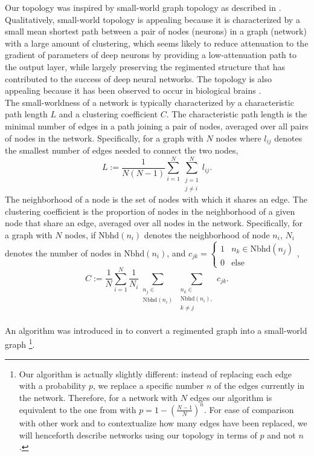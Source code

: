\documentclass{article}
\newcommand{\npar}{\\\indent}
\begin{document}
Our topology was inspired by small-world graph topology as described in \cite{watts98}. Qualitatively, small-world topology is appealing because it is characterized by a small mean shortest path between a pair of nodes (neurons) in a graph (network) with a large amount of clustering, which seems likely to reduce attenuation to the gradient of parameters of deep neurons by providing a low-attenuation path to the output layer, while largely preserving the regimented structure that has contributed to the success of deep neural networks. The topology is also appealing because it has been observed to occur in biological brains \cite{bullmore2009}.
\npar
The small-worldness of a network is typically characterized by a characteristic path length $L$ and a clustering coefficient $C$. The characteristic path length is the minimal number of edges in a path joining a pair of nodes, averaged over all pairs of nodes in the network. Specifically, for a graph with $N$ nodes where $l_{ij}$ denotes the smallest number of edges needed to connect the two nodes, 
\begin{equation}
\label{eqn:charpathlength}
L:=\frac{1}{N(N-1)}\sum_{i=1}^{N}\sum_{\substack{j=1\\j\neq i}}^{N}l_{ij}.
\end{equation}
The neighborhood of a node is the set of nodes with which it shares an edge. The clustering coefficient is the proportion of nodes in the neighborhood of a given node that share an edge, averaged over all nodes in the network. Specifically, for a graph with $N$ nodes, if $\text{Nbhd}(n_i)$ denotes the neighborhood of node $n_i$, $N_i$ denotes the number of nodes in $\text{Nbhd}(n_i)$, and $c_{jk}=\begin{cases}1 & n_k\in\text{Nbhd}(n_j)\\0 & \text{else}\end{cases}$,
\begin{equation}
\label{eqn:clustcoeff}
C:=\frac{1}{N}\sum_{i=1}^{N}\frac{1}{N_i}\sum_{\substack{n_j\in\\\text{Nbhd}(n_i)}}\sum_{\substack{n_k\in\\\text{Nbhd}(n_i),\\ k\neq j}}c_{jk}.
\end{equation}
\npar
An algorithm was introduced in \cite{watts98} to convert a regimented graph into a small-world graph
\footnote{Our algorithm is actually slightly different: instead of replacing each edge with a probability $p$, we replace a specific number $n$ of the edges currently in the network. Therefore, for a network with $N$ edges our algorithm is equivalent to the one from \cite{watts98} with $p=1-(\frac{N-1}{N})^n$. For ease of comparison with other work and to contextualize how many edges have been replaced, we will henceforth describe networks using our topology in terms of $p$ and not $n$.}.
\end{document}
